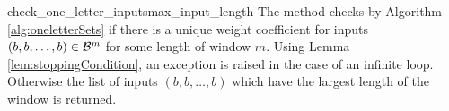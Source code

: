 \begin{method}{check\_one\_letter\_inputs}{max\_input\_length}
The method checks by Algorithm \ref{alg:oneletterSets} if there is a unique weight coefficient for inputs $({b,b,\dots,b})\in\mathcal{B}^m$ for some length of window $m$. Using Lemma \ref{lem:stoppingCondition}, an exception is raised in the case of an infinite loop. Otherwise the list of inputs $(b,b,\dots,b)$ which have the largest length of the window is returned.
\end{method}
